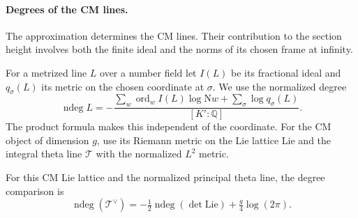\paragraph{Degrees of the CM lines.}

The approximation determines the CM lines. Their contribution to the section height involves both the finite ideal and the norms of its chosen frame at infinity.

For a metrized line \(L\) over a number field let
\(I(L)\) be its fractional ideal and \(q_\sigma(L)\) its
metric on the chosen coordinate at \(\sigma\). We use the
normalized degree
\[
 \operatorname{ndeg}L
   =-\frac{\sum_w\operatorname{ord}_w I(L)\log\mathrm Nw+
                   \sum_\sigma\log q_\sigma(L)}
              {[K':\mathbb Q]} .
\]
The product formula makes this independent of the coordinate.
For the CM object of dimension \(g\), use its Riemann
metric on the Lie lattice \(\mathrm{Lie}\) and the integral
theta line \(\mathcal T\) with the normalized \(L^2\) metric.
\begin{lemma}\label{lem:slice-principal-theta-degree}
For this CM Lie lattice and the normalized principal theta line,
the degree comparison is
\begin{equation}\label{eq:slice-cm-theta-degree}
 \operatorname{ndeg}(\mathcal T^\vee)
      =-\tfrac12\operatorname{ndeg}(\det\mathrm{Lie})
                         +\tfrac{g}{4}\log(2\pi).
\end{equation}
\end{lemma}

